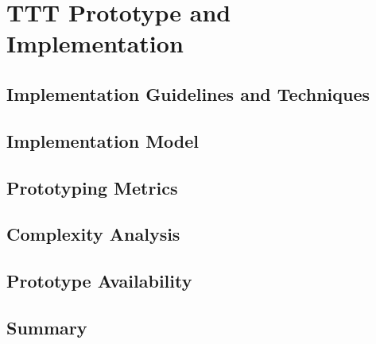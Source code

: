 
%

\chapter{TTT Prototype and Implementation}\label{cha:implementation}

\section{Implementation Guidelines and Techniques}\label{sec:implementation_guidelines}

\section{Implementation Model}\label{sec:implementation_model}

\section{Prototyping Metrics}\label{sec:prototyping_metrics}



\section{Complexity Analysis}\label{sec:complexity_analysis}



\section{Prototype Availability}\label{sec:prototype_availability}



\section{Summary}\label{sec:implementation_summary}